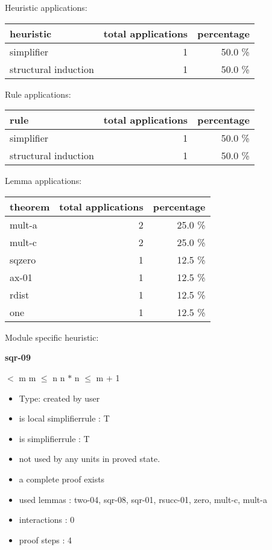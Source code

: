 \documentclass[a4paper]{article}
\begin{document}
\medskip


Heuristic applications:

\begin{supertabular}{l|r|r}
heuristic	& total applications & percentage \\ \hline
simplifier & 1 & 50.0 \% \\
structural induction & 1 & 50.0 \% \\

\end{supertabular}

Rule applications:

\begin{supertabular}{l|r|r}
rule	        & total applications & percentage \\ \hline
simplifier & 1 & 50.0 \% \\
structural induction & 1 & 50.0 \% \\

\end{supertabular}

Lemma applications:

\begin{supertabular}{l|r|r}
theorem	        & total applications & percentage \\ \hline
mult-a & 2 & 25.0 \% \\
mult-c & 2 & 25.0 \% \\
sqzero & 1 & 12.5 \% \\
ax-01 & 1 & 12.5 \% \\
rdist & 1 & 12.5 \% \\
one & 1 & 12.5 \% \\

\end{supertabular}

Module specific heuristic:

\pagebreak

{\LARGE\bf sqr-09}\label{lemma-sqr-09}

\medskip

  $<$ m \And m $\le$ n \Imp \Not n $*$ n $\le$ m + 1

\begin{itemize}

\item Type: created by user

\item is local simplifierrule : T
\item is simplifierrule : T
\item not used by any units in proved state.
\item       a complete proof exists
\item       used lemmas  : two-04, sqr-08, sqr-01, rsucc-01, zero, mult-c, mult-a
\item       interactions : 0
\item       proof steps  : 4
\end{itemize}
\end{document}

